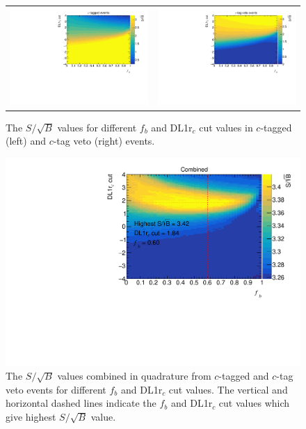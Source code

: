 \begin{figure}[htbp]
	\centering
	\begin{tabular}{cc}
		\includegraphics[width=.42\textwidth]{Appendices/AP3/figures/c-tagged} &
		\includegraphics[width=.42\textwidth]{Appendices/AP3/figures/c-tag_veto}
	\end{tabular}
	\caption{ The $S/\sqrt{B}$ values for different $f_b$ and DL1r$_c$ cut values in $c$-tagged (left) and $c$-tag veto (right) events. }
	\label{app:DL1rc:fig:SoverSqrtB}
\end{figure}
\begin{figure}[htbp]
	\centering
	\includegraphics[width=.43\textwidth]{Appendices/AP3/figures/Combined}
	\caption{ The $S/\sqrt{B}$ values combined in quadrature from $c$-tagged and $c$-tag veto events for different $f_b$ and DL1r$_c$ cut values.
		The vertical and horizontal dashed lines indicate the $f_b$ and DL1r$_c$ cut values which give highest $S/\sqrt{B}$ value. }
	\label{app:DL1rc:fig:SoverSqrtB_combined}
\end{figure}
\vspace{-0.3cm}
